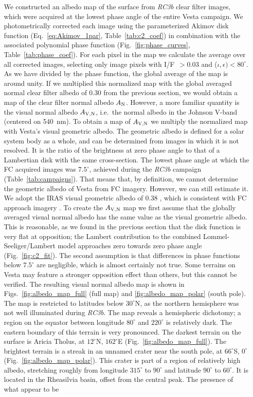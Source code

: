 \documentclass[3p,authoryear]{elsarticle}
\begin{document}
We constructed an albedo map of the surface from {\it RC3b} clear filter images, which were acquired at the lowest phase angle of the entire Vesta campaign. We photometrically corrected each image using the parameterized Akimov disk function (Eq.~\ref{eq:Akimov_1par}, Table~\ref{tab:c2_coef}) in combination with the associated polynomial phase function (Fig.~\ref{fig:phase_curves}, Table~\ref{tab:phase_coef}). For each pixel in the map we calculate the average over all corrected images, selecting only image pixels with I/F~$> 0.03$ and ($\iota, \epsilon) < 80^\circ$. As we have divided by the phase function, the global average of the map is around unity. If we multiplied this normalized map with the global averaged normal clear filter albedo of 0.30 from the previous section, we would obtain a map of the clear filter normal albedo $A_{\rm N}$. However, a more familiar quantity is the visual normal albedo $A_{\rm V,N}$, i.e.\ the normal albedo in the Johnson V-band (centered on 540~nm). To obtain a map of $A_{\rm V,N}$ we multiply the normalized map with Vesta's visual geometric albedo. The geometric albedo is defined for a solar system body as a whole, and can be determined from images in which it is not resolved. It is the ratio of the brightness at zero phase angle to that of a Lambertian disk with the same cross-section. The lowest phase angle at which the FC acquired images was $7.5^\circ$, achieved during the {\it RC3b} campaign (Table~\ref{tab:campaigns}). That means that, by definition, we cannot determine the geometric albedo of Vesta from FC imagery. However, we can still estimate it. We adopt the IRAS visual geometric albedo of 0.38 \citep{T89}, which is consistent with FC approach imagery \citep{L13}. To create the $A_{\rm V,N}$ map we first assume that the globally averaged visual normal albedo has the same value as the visual geometric albedo. This is reasonable, as we found in the previous section that the disk function is very flat at opposition; the Lambert contribution to the combined Lommel-Seeliger/Lambert model approaches zero towards zero phase angle (Fig.~\ref{fig:c2_fit}). The second assumption is that differences in phase functions below $7.5^\circ$ are negligible, which is almost certainly not true. Some terrains on Vesta may feature a stronger opposition effect than others, but this cannot be verified. The resulting visual normal albedo map is shown in Figs.~\ref{fig:albedo_map_full} (full map) and \ref{fig:albedo_map_polar} (south pole). The map is restricted to latitudes below $30^\circ$N, as the northern hemisphere was not well illuminated during {\it RC3b}. The map reveals a hemispheric dichotomy; a region on the equator between longitude $80^\circ$ and $220^\circ$ is relatively dark. The eastern boundary of this terrain is very pronounced. The darkest terrain on the surface is Aricia Tholus, at $12^\circ$N, $162^\circ$E (Fig.~\ref{fig:albedo_map_full}). The brightest terrain is a streak in an unnamed crater near the south pole, at $66^\circ$S, $0^\circ$ (Fig.~\ref{fig:albedo_map_polar}). This crater is part of a region of relatively high albedo, stretching roughly from longitude $315^\circ$ to $90^\circ$ and latitude $90^\circ$ to $60^\circ$. It is located in the Rheasilvia basin, offset from the central peak. The presence of what appear to be 
\end{document}
